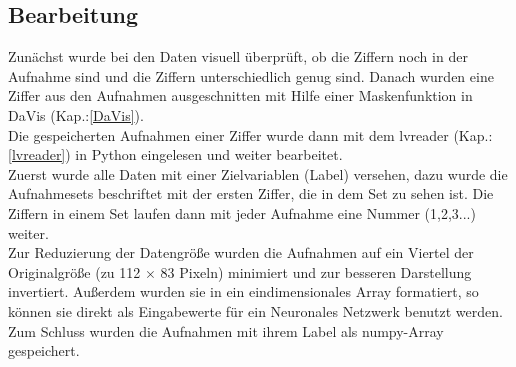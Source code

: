 \subsection{Bearbeitung}
Zunächst wurde bei den Daten  visuell überprüft,  ob die Ziffern  noch in der Aufnahme sind und die Ziffern unterschiedlich genug sind.  Danach wurden eine Ziffer aus den Aufnahmen ausgeschnitten mit Hilfe  einer Maskenfunktion in DaVis  (Kap.:\ref{DaVis}).\\
Die gespeicherten Aufnahmen einer Ziffer wurde dann mit dem lvreader  (Kap.:\ref{lvreader}) in Python eingelesen und weiter bearbeitet.\\
Zuerst wurde alle Daten mit einer Zielvariablen (Label) versehen, dazu wurde die   Aufnahmesets beschriftet mit der ersten Ziffer,  die in dem Set zu sehen ist.  Die  Ziffern in einem Set laufen dann mit jeder Aufnahme eine Nummer (1,2,3...) weiter.\\

Zur Reduzierung der Datengröße wurden die Aufnahmen auf ein Viertel der Originalgröße (zu 112 $\times$ 83 Pixeln) minimiert und zur besseren Darstellung invertiert.  Außerdem wurden sie in ein eindimensionales Array formatiert, so können sie direkt als Eingabewerte für ein Neuronales Netzwerk benutzt werden.\\
Zum Schluss wurden die Aufnahmen mit ihrem Label als numpy-Array gespeichert.\\

\newpage
